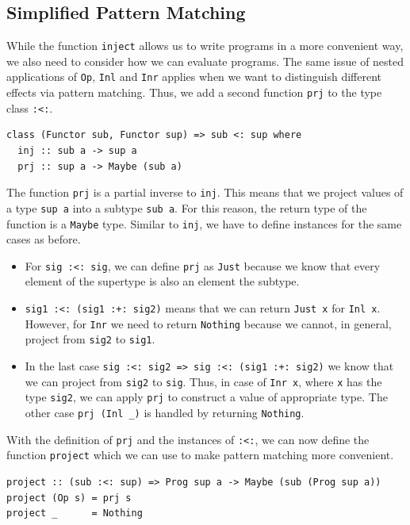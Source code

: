 \documentclass[a4paper, 11pt, fleqn, twoside]{scrreprt}
\newcommand{\hinl}[1]{\texttt{#1}}
\begin{document}
\subsection{Simplified Pattern Matching}
While the function \hinl{inject} allows us to write programs in a more convenient way, we also need to consider how we can evaluate programs.
The same issue of nested applications of \hinl{Op}, \hinl{Inl} and \hinl{Inr} applies when we want to distinguish different effects via pattern matching.
Thus, we add a second function \hinl{prj} to the type class \hinl{:<:}.

\begin{verbatim}
class (Functor sub, Functor sup) => sub <: sup where
  inj :: sub a -> sup a
  prj :: sup a -> Maybe (sub a)
\end{verbatim}

The function \hinl{prj} is a partial inverse to \hinl{inj}.
This means that we project values of a type \hinl{sup a} into a subtype \hinl{sub a}.
For this reason, the return type of the function is a \hinl{Maybe} type.
Similar to \hinl{inj}, we have to define instances for the same cases as before.

\begin{itemize}
\item For \hinl{sig :<: sig}, we can define \hinl{prj} as \hinl{Just} because we know that every element of the supertype is also an element the subtype.

\item \hinl{sig1 :<: (sig1 :+: sig2)} means that we can return \hinl{Just x} for \hinl{Inl x}.
However, for \hinl{Inr} we need to return \hinl{Nothing} because we cannot, in general, project from \hinl{sig2} to \hinl{sig1}.

\item In the last case \hinl{sig :<: sig2 => sig :<: (sig1 :+: sig2)} we know that we can project from \hinl{sig2} to \hinl{sig}.
Thus, in case of \hinl{Inr x}, where \hinl{x} has the type \hinl{sig2}, we can apply \hinl{prj} to construct a value of appropriate type.
The other case \hinl{prj (Inl _)} is handled by returning \hinl{Nothing}.
\end{itemize}

With the definition of \hinl{prj} and the instances of \hinl{:<:}, we can now define the function \hinl{project} which we can use to make pattern matching more convenient.

\begin{verbatim}
project :: (sub :<: sup) => Prog sup a -> Maybe (sub (Prog sup a))
project (Op s) = prj s
project _      = Nothing
\end{verbatim}
\end{document}

